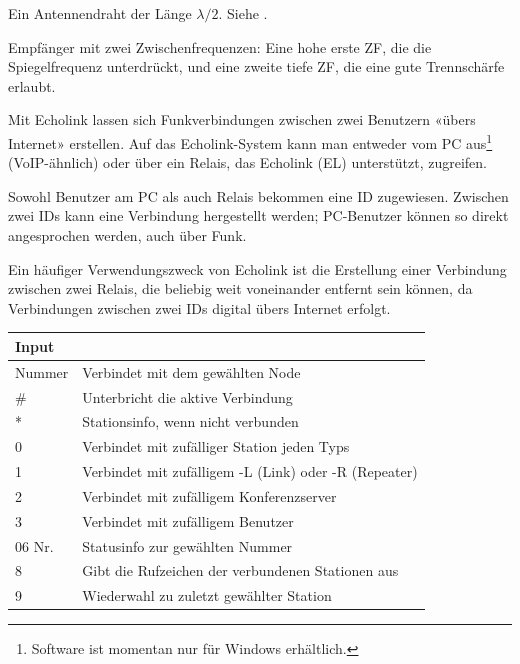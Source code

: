 {Ein Antennendraht der Länge $\lambda/2$. Siehe .}

{Empfänger mit zwei Zwischenfrequenzen: Eine hohe erste ZF, die die Spiegelfrequenz unterdrückt, und eine zweite tiefe ZF, die eine gute Trennschärfe erlaubt. }

{

Mit Echolink lassen sich Funkverbindungen zwischen zwei Benutzern «übers Internet» erstellen. Auf das Echolink-System kann man entweder vom PC aus\footnote{Software ist momentan nur für Windows erhältlich.} (VoIP-ähnlich) oder über ein Relais, das Echolink (EL) unterstützt, zugreifen. 

Sowohl Benutzer am PC als auch Relais bekommen eine ID zugewiesen. Zwischen zwei IDs kann eine Verbindung hergestellt werden; PC-Benutzer können so direkt angesprochen werden, auch über Funk.

Ein häufiger Verwendungszweck von Echolink ist die Erstellung einer Verbindung zwischen zwei Relais, die beliebig weit voneinander entfernt sein können, da Verbindungen zwischen zwei IDs digital übers Internet erfolgt.

\vspace{1em}
\begin{tabular}{ll}
\bfseries Input & \\ \toprule \arrayrulecolor{rowsep}
Nummer & Verbindet mit dem gewählten Node \\ \midrule
\# & Unterbricht die aktive Verbindung \\ \midrule
* & Stationsinfo, wenn nicht verbunden \\ \midrule
0 & Verbindet mit zufälliger Station jeden Typs \\ \midrule
1 & Verbindet mit zufälligem -L (Link) oder -R (Repeater) \\ \midrule
2 & Verbindet mit zufälligem Konferenzserver \\ \midrule
3 & Verbindet mit zufälligem Benutzer \\ \midrule
06 Nr. & Statusinfo zur gewählten Nummer \\ \midrule
8 & Gibt die Rufzeichen der verbundenen Stationen aus  \\ \midrule
9 & Wiederwahl zu zuletzt gewählter Station \\ \midrule
\end{tabular}
}


